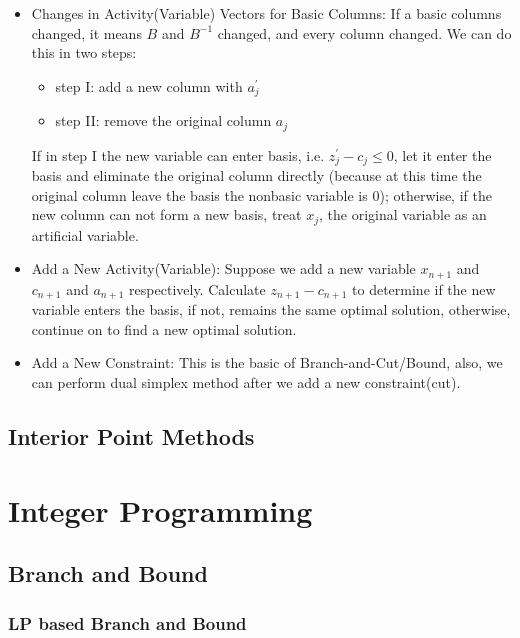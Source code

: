 \begin{itemize}
\begin{itemize}
						\item Changes in Activity(Variable) Vectors for Basic Columns: If a basic columns changed, it means $B$ and $B^{-1}$ changed, and every column changed. We can do this in two steps:
						\begin{itemize}
							\item step I: add a new column with $a_j^\prime$
							\item step II: remove the original column $a_j$
						\end{itemize}
						If in step I the new variable can enter basis, i.e. $z_j^\prime  - c_j \le 0$, let it enter the basis and eliminate the original column directly (because at this time the original column leave the basis the nonbasic variable is 0); otherwise, if the new column can not form a new basis, treat $x_j$, the original variable as an artificial variable.
						\item Add a New Activity(Variable): Suppose we add a new variable $x_{n+1}$ and $c_{n+1}$ and $a_{n+1}$ respectively. Calculate $z_{n+1} - c_{n+1}$ to determine if the new variable enters the basis, if not, remains the same optimal solution, otherwise, continue on to find a new optimal solution.
						\item Add a New Constraint: This is the basic of Branch-and-Cut/Bound, also, we can perform dual simplex method after we add a new constraint(cut).
					\end{itemize}
				\end{itemize}			

		\chapter{Interior Point Methods}

	\part{Integer Programming}\label{IP}
		\chapter{Branch and Bound}
			\section{LP based Branch and Bound}
